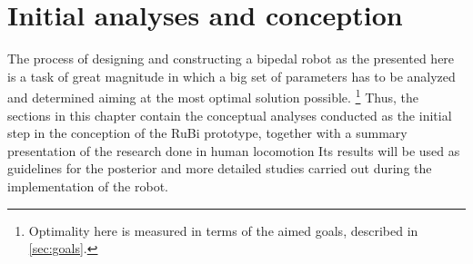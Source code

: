 \chapter{Initial analyses and conception} %
\label{cha:analysis}
The process of designing and constructing a bipedal robot as the presented here is a task of great magnitude in which a big set of parameters has to be analyzed and determined aiming at the most optimal solution possible. \footnote{Optimality here is measured in terms of the aimed goals, described in \ref{sec:goals}.}
Thus, the sections in this chapter contain the conceptual analyses conducted as the initial step in the conception of the RuBi prototype, together with a summary presentation of the research done in human locomotion 
Its results will be used as guidelines for the posterior and more detailed studies carried out during the implementation of the robot.






